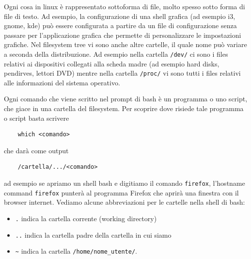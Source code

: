 \documentclass[11pt]{book}
\begin{document}
Ogni cosa in linux è rappresentato sottoforma di file, molto spesso sotto forma di file di testo. Ad esempio, la configurazione di una shell grafica (ad esempio i3, gnome, kde) può essere configurata a partire da un file di configurazione senza passare per l'applicazione grafica che permette di personalizzare le impostazioni grafiche. Nel filesystem tree vi sono anche altre cartelle, il quale nome può variare a seconda della distribuzione. Ad esempio nella cartella \verb"/dev/" ci sono i files relativi ai dispositivi collegati alla scheda madre (ad esempio hard disks, pendirves, lettori DVD) mentre nella cartella \verb"/proc/" vi sono tutti i files relativi alle informazioni del sistema operativo.

Ogni comando che viene scritto nel prompt di bash è un programma o uno script, che giace in una cartella del filesystem. Per scoprire dove risiede tale programma o script basta scrivere
\begin{verbatim}
	which <comando>
\end{verbatim}
che darà come output
\begin{verbatim}
	/cartella/.../<comando>
\end{verbatim}
ad esempio se apriamo un shell bash e digitiamo il comando \verb"firefox", l'hostname command \verb"firefox" punterà al programma Firefox che aprirà una finestra con il browser internet. Vediamo alcune abbreviazioni per le cartelle nella shell di bash:
\begin{itemize}
	\item \verb"." indica la cartella corrente (working directory)
	\item \verb".." indica la cartella padre della cartella in cui siamo 
	\item \verb"~" indica la cartella \verb"/home/nome_utente/".
\end{itemize}
\end{document}
